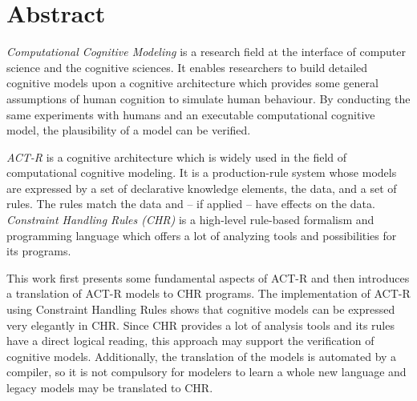 \chapter*{Abstract}

\emph{Computational Cognitive Modeling} is a research field at the interface of computer science and the cognitive sciences. It enables researchers to build detailed cognitive models upon a cognitive architecture which provides some general assumptions of human cognition to simulate human behaviour. By conducting the same experiments with humans and an executable computational cognitive model, the plausibility of a model can be verified.

\emph{ACT-R} is a cognitive architecture which is widely used in the field of computational cognitive modeling. It is a production-rule system whose models are expressed by a set of declarative knowledge elements, the data, and a set of rules. The rules match the data and -- if applied -- have effects on the data. \emph{Constraint Handling Rules (CHR)} is a high-level rule-based formalism and programming language which offers a lot of analyzing tools and possibilities for its programs. 

This work first presents some fundamental aspects of ACT-R and then introduces a translation of ACT-R models to CHR programs. The implementation of ACT-R using Constraint Handling Rules shows that cognitive models can be expressed very elegantly in CHR. Since CHR provides a lot of analysis tools and its rules have a direct logical reading, this approach may support the verification of cognitive models. Additionally, the translation of the models is automated by a compiler, so it is not compulsory for modelers to learn a whole new language and legacy models may be translated to CHR.